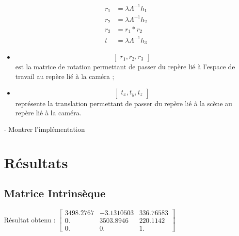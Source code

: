 \documentclass{article}
\begin{document}
\begin{equation}
  \begin{aligned}
    r_1 &= \lambda A^{-1} h_1 \\
    r_2 &= \lambda A^{-1} h_2 \\
    r_3 &= r_1 * r_2 \\
    t &= \lambda A^{-1} h_3
  \end{aligned}
\end{equation}

\begin{itemize}
\item
\begin{equation}
  \begin{bmatrix}
    r_1, r_2, r_3
  \end{bmatrix}
\end{equation}
est la matrice de rotation permettant de passer du repère lié à l'espace de travail au repère lié à la caméra ;

\item
\begin{equation}
  \begin{bmatrix}
    t_x, t_y, t_z
  \end{bmatrix}
\end{equation}
 représente la translation permettant de passer du repère lié à la scène au repère lié à la caméra.
\end{itemize}

- Montrer l'implémentation


\section{Résultats}

\subsection{Matrice Intrinsèque}

Résultat obtenu :
  $\begin{bmatrix}
      3498.2767 & - 3.1310503  &  336.76583 \\
      0.        &   3503.8946  &  220.1142 \\
      0.        &   0.         &  1.
  \end{bmatrix}$
\end{document}
